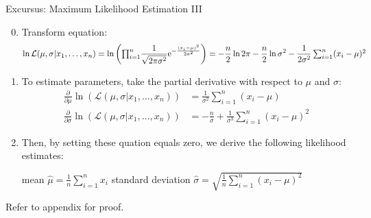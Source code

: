 \begin{frame}{Excursus: Maximum Likelihood Estimation III}
	\begin{enumerate}
		\setcounter{enumi}{-1}
		\item Transform equation:
		      \vspace*{-1em}
		      \begin{equation*}
			      \ln \mathcal{L}(\mu, \sigma | x_1, \dots, x_n) = \ln{\bigg({\textstyle\prod\nolimits_{i=1}^n} \frac{1}{\sqrt{2\pi \sigma^2}} {\rm e}^{-\frac{(x_i-\mu)^2}{2\sigma^2}}\bigg)}= -\frac{n}{2}\ln{2\pi}-\frac{n}{2}\ln{\sigma^2}-\frac{1}{2\sigma^2}\textstyle\sum\nolimits_{i=1}^n (x_i - \mu)^2
		      \end{equation*}
		\item To estimate parameters, take the partial derivative with respect to $\mu$ and $\sigma$:
		      \vspace*{-1em}
		      \begin{align*}
			      \textstyle\frac{\partial}{\partial \mu}\ln{(\mathcal{L}(\mu, \sigma|x_1, \dots, x_n))}    & = \frac{1}{\sigma^2} \sum_{i=1}^n (x_i -\mu)                            \\
			      \textstyle\frac{\partial}{\partial \sigma}\ln{(\mathcal{L}(\mu, \sigma|x_1, \dots, x_n))} & =-\textstyle\frac{n}{\sigma}+\frac{1}{\sigma^3}\sum_{i=1}^n (x_i-\mu)^2
		      \end{align*}
		\item Then, by setting these quation equals zero, we derive the following likelihood estimates:
		      \begin{center}
			      mean $\widehat{\mu}=\frac{1}{n}\sum\nolimits_{i=1}^n x_i$ \hspace{3em} standard deviation $\widehat{\sigma}=\sqrt{\frac{1}{n}\sum\nolimits_{i=1}^n (x_i-\mu)^2}$
		      \end{center}
	\end{enumerate}
	\begin{flushright}
		{\color{gray}Refer to appendix for proof.}
	\end{flushright}
\end{frame}

